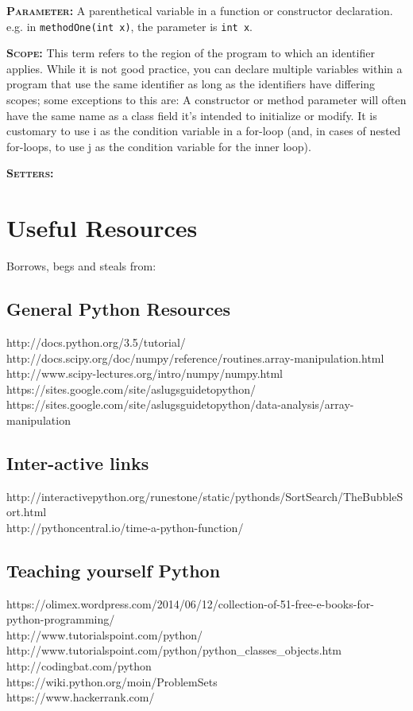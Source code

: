 \documentclass[11pt,a4paper]{article}
\begin{document}
\smallskip \smallskip
\noindent \textbf{\textsc{Parameter:}} A parenthetical variable in a
function or constructor declaration. e.g. in {\tt methodOne(int x)},
the parameter is {\tt int x}.

\smallskip \smallskip
\noindent \textbf{\textsc{Scope:}} This term refers to the region of
the program to which an identifier applies. While it is not good
practice, you can declare multiple variables within a program that use
the same identifier as long as the identifiers have differing scopes;
some exceptions to this are: A constructor or method parameter will
often have the same name as a class field it's intended to initialize
or modify.  It is customary to use i as the condition variable in a
for-loop (and, in cases of nested for-loops, to use j as the condition
variable for the inner loop).

\smallskip \smallskip
\noindent \textbf{\textsc{Setters:}}





\newpage
\section{Useful Resources}
Borrows, begs and steals from: \\

\subsection*{General Python Resources}
http://docs.python.org/3.5/tutorial/\\
http://docs.scipy.org/doc/numpy/reference/routines.array-manipulation.html\\
http://www.scipy-lectures.org/intro/numpy/numpy.html\\
https://sites.google.com/site/aslugsguidetopython/\\
https://sites.google.com/site/aslugsguidetopython/data-analysis/array-manipulation\\

\subsection*{Inter-active links}
http://interactivepython.org/runestone/static/pythonds/SortSearch/TheBubbleSort.html\\
http://pythoncentral.io/time-a-python-function/\\


\subsection*{Teaching yourself Python}
https://olimex.wordpress.com/2014/06/12/collection-of-51-free-e-books-for-python-programming/\\
http://www.tutorialspoint.com/python/\\
http://www.tutorialspoint.com/python/python\_classes\_objects.htm\\
http://codingbat.com/python\\
https://wiki.python.org/moin/ProblemSets\\
https://www.hackerrank.com/\\
\end{document}
